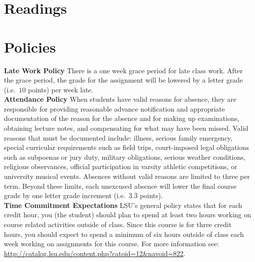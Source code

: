 \documentclass[11pt,article,oneside]{memoir}
\begin{document}
\clearpage


\section{Readings}
\vspace*{0.5cm}
\nocite{*}
\setlength{}
\printbibliography[heading=none]


\section{Policies}

\noindent \textbf{Late Work Policy}
There is a one week grace period for late class work. 
After the grace period, 
the grade for the assignment will be lowered by
a letter grade (i.e.~$10$ points) per week late.\\

\noindent \textbf{Attendance Policy}
When students have valid reasons for absence, they are responsible for providing reasonable advance notification and appropriate documentation of the reason for the absence and for making up examinations, obtaining lecture notes, and compensating for what may have been missed. Valid reasons that must be documented include: illness, serious family emergency, special curricular requirements such as field trips, court-imposed legal obligations such as subpoenas or jury duty, military obligations, serious weather conditions, religious observances, official participation in varsity athletic competitions, or university musical events. Absences without valid reasons are limited to three per term. Beyond these limits, each unexcused absence will lower the final course grade by one letter grade increment (i.e.~$3.\overline{3}$ points).\\

\noindent \textbf{Time Commitment Expectations}
LSU's general policy states that for each credit hour, you (the student) should plan to
spend at least two hours working on course related activities outside of class. Since this course is for three credit hours, you should expect to spend a minimum of six hours outside of class each week working on assignments for this course. For more information see: 
\url{http://catalog.lsu.edu/content.php?catoid=12&navoid=822}.\\
\end{document}
